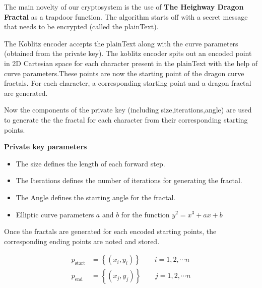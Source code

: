\documentclass[cryptography,article,submit,moreauthors,pdftex]{Definitions/mdpi}
\begin{document}
\begin{flushleft}
The main novelty of our cryptosystem is the use of \textbf{The Heighway Dragon Fractal} as a trapdoor function. The algorithm starts off with a secret message that needs to be encrypted (called the plainText).
\end{flushleft}

\begin{flushleft}
The Koblitz encoder accepts the plainText along with the curve parameters (obtained from the private key). The koblitz encoder spits out an encoded point in 2D Cartesian space for each character present in the plainText with the help of curve parameters.These points are now the starting point of the dragon curve fractals. For each character, a corresponding starting point and a dragon fractal are generated.
\end{flushleft}

\begin{flushleft}
Now the components of the private key (including size,iterations,angle) are used to generate the the fractal for each character from their corresponding starting points.
\end{flushleft}

\newpage
\begin{flushleft}
\textbf{Private key parameters}
\begin{itemize}
	\item The size defines the length of each forward step.
	\item The Iterations defines the number of iterations for generating the fractal.
	\item The Angle defines the starting angle for the fractal.
	\item Elliptic curve parameters $a$ and $b$ for the function $y^2=x^3+ax+b$
\end{itemize}
\end{flushleft}

\begin{flushleft}
Once the fractals are generated for each encoded starting points, the corresponding ending points are noted and stored.

\begin{align*}
	p_{\text{start}}&=\left\{(x_i,y_i)\right\}\qquad i=1,2,\cdots n\\
	p_{\text{end}}&=\left\{(x_j,y_j)\right\}\qquad j=1,2,\cdots n
\end{align*}
\end{flushleft}
\end{document}
